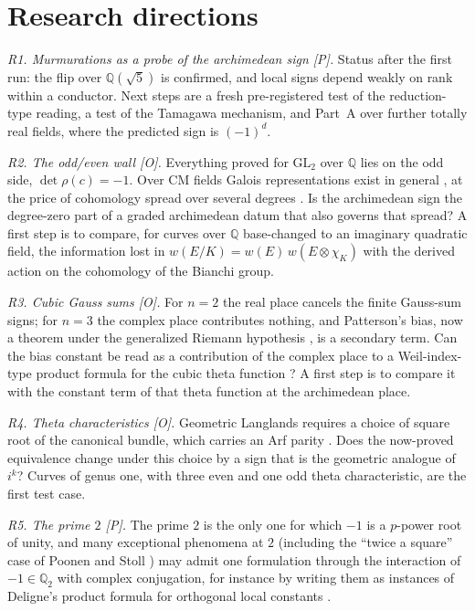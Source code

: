 \documentclass[11pt]{amsart}
\numberwithin{equation}{section}
\newcommand{\Q}{\mathbb{Q}}
\newcommand{\GL}{\mathrm{GL}}
\newcommand{\Kfield}{\Q(\sqrt{5})}
\begin{document}
\section{Research directions}\label{sec:directions}

\emph{R1. Murmurations as a probe of the archimedean sign [P].} Status after the first run: the flip over $\Kfield$ is confirmed, and local signs depend weakly on rank within a conductor. Next steps are a fresh pre-registered test of the reduction-type reading, a test of the Tamagawa mechanism, and Part~A over further totally real fields, where the predicted sign is $(-1)^d$.

\emph{R2. The odd/even wall [O].} Everything proved for $\GL_2$ over $\Q$ lies on the odd side, $\det\rho(c)=-1$. Over CM fields Galois representations exist in general \cite{HLTT2016,Scholze2015,Allen2023}, at the price of cohomology spread over several degrees \cite{Venkatesh2019}. Is the archimedean sign the degree-zero part of a graded archimedean datum that also governs that spread? A first step is to compare, for curves over $\Q$ base-changed to an imaginary quadratic field, the information lost in $w(E/K)=w(E)\,w(E\otimes\chi_K)$ with the derived action on the cohomology of the Bianchi group.

\emph{R3. Cubic Gauss sums [O].} For $n=2$ the real place cancels the finite Gauss-sum signs; for $n=3$ the complex place contributes nothing, and Patterson's bias, now a theorem under the generalized Riemann hypothesis \cite{DunnRadziwill2024}, is a secondary term. Can the bias constant be read as a contribution of the complex place to a Weil-index-type product formula for the cubic theta function \cite{KazhdanPatterson1984}? A first step is to compare it with the constant term of that theta function at the archimedean place.

\emph{R4. Theta characteristics [O].} Geometric Langlands requires a choice of square root of the canonical bundle, which carries an Arf parity \cite{Atiyah1971}. Does the now-proved equivalence \cite{GaitsgoryRaskin2024} change under this choice by a sign that is the geometric analogue of $i^k$? Curves of genus one, with three even and one odd theta characteristic, are the first test case.

\emph{R5. The prime $2$ [P].} The prime $2$ is the only one for which $-1$ is a $p$-power root of unity, and many exceptional phenomena at $2$ (including the ``twice a square'' case of Poonen and Stoll \cite{PoonenStoll1999}) may admit one formulation through the interaction of $-1\in\Q_2$ with complex conjugation, for instance by writing them as instances of Deligne's product formula for orthogonal local constants \cite{Deligne1976}.
\end{document}
